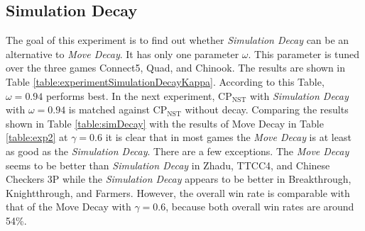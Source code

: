 \documentclass[journal]{IEEEtran}
\begin{document}
\subsection{Simulation Decay}
The goal of this experiment is to find out whether \textit{Simulation Decay} can be an alternative to \textit{Move Decay}. It has only one parameter $\omega$. This parameter is tuned over the three games Connect5, Quad, and Chinook. The results are shown in Table \ref{table:experimentSimulationDecayKappa}. According to this Table, $\omega=0.94$ performs best. In the next experiment, CP$_{\textrm{NST}}$ with \textit{Simulation Decay} with $\omega=0.94$ is matched against CP$_{\textrm{NST}}$ without decay. Comparing the results shown in Table \ref{table:simDecay} with the results of Move Decay in Table \ref{table:exp2} at $\gamma=0.6$ it is clear that in most games the \textit{Move Decay} is at least as good as the \textit{Simulation Decay}. There are a few exceptions. The \textit{Move Decay} seems to be better than \textit{Simulation Decay} in Zhadu, TTCC4, and Chinese Checkers 3P while the \textit{Simulation Decay} appears to be better in Breakthrough, Knightthrough, and Farmers. However, the overall win rate is comparable with that of the Move Decay with $\gamma=0.6$, because both overall win rates are around 54\%.
\end{document}

